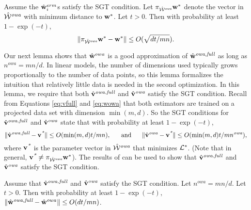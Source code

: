 \documentclass[thesis.tex]{subfiles}
\newcommand{\nowa}{n^{\textit{owa}}}
\begin{document}
\begin{lemma}
\label{lemma:wwstar}
Assume the $\hat{\mathbf w}^{erm}_i$s satisfy the SGT condition.
Let $\pi_{{{\hat {{\mathcal W}}^{\textit{owa}}}}}{\mathbf w^{*}}$ denote the vector in ${\hat {{\mathcal W}}^{\textit{owa}}}$ with minimum distance to ${\mathbf w^{*}}$.
Let $t>0$. 
Then with probability at least $1-\exp(-t)$,
\begin{equation}
\label{eq:wwstar}
{\lVert {\pi_{{{\hat {{\mathcal W}}^{\textit{owa}}}}}{\mathbf w^{*}}-{\mathbf w^{*}}} \rVert} \le O(\sqrt{dt/mn})
.
\end{equation}
\end{lemma}

Our next lemma shows that $\hat{\mathbf w}^{owa}$ is a good approximation of $\hat{\mathbf w}^{\textit{owa,full}}$ as long as $\nowa=mn/d$. 
In linear models, the number of dimensions used typically grows proportionally to the number of data points, so this lemma formalizes the intuition that relatively little data is needed in the second optimization.
In this lemma, we require that both $\hat{\mathbf{v}}^{\textit{owa,full}}$ and $\hat{\mathbf{v}}^{\textit{owa}}$ satisfy the SGT condition.
Recall from Equations \ref{eq:vfull} and \ref{eq:wowa} that both estimators are trained on a projected data set with dimension $\min(m,d)$.
So the SGT conditions for $\hat{\mathbf{v}}^{\textit{owa,full}}$ and $\hat{\mathbf{v}}^{\textit{owa}}$ state that with probability at least $1-\exp(-t)$,
\vspace{-0.15in}
\begin{equation}
    \ltwo{\vfull-\vstar} \le O(\min(m,d)t/mn),
    \text{~~~~~and~~~~~}
    \ltwo{\vowa-\vstar} \le O(\min(m,d)t/m\nowa),
\end{equation}
where $\mathbf{v}^{\textit{*}}$ is the parameter vector in ${\hat {{\mathcal W}}^{\textit{owa}}}$ that minimizes $\mathcal{L}^*$.
(Note that in general, $\mathbf{v}^{\textit{*}}\ne\pi_{{{\hat {{\mathcal W}}^{\textit{owa}}}}}{\mathbf w^{*}}$).
The results of \citet{spokoiny2012parametricestimation} can be used to show that $\hat{\mathbf{v}}^{\textit{owa,full}}$ and $\hat{\mathbf{v}}^{\textit{owa}}$ satisfy the SGT condition.



\begin{lemma}
    \label{lemma:wowafullwowa}
Assume that $\hat{\mathbf{v}}^{\textit{owa,full}}$ and $\hat{\mathbf{v}}^{\textit{owa}}$ satisfy the SGT condition.
Let $\nowa=mn/d$.
Let $t>0$.
Then with probability at least $1-\exp(-t)$, ${\lVert {\hat{\mathbf w}^{\textit{owa,full}}-\hat{\mathbf w}^{owa}} \rVert}\le O(dt/mn)$.
\end{lemma}
\end{document}
